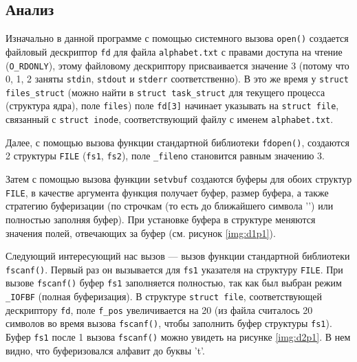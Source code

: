 
\clearpage

\subsection{Анализ}

Изначально в данной программе с помощью системного вызова \texttt{open()} создается файловый дескриптор \texttt{fd} для файла \texttt{alphabet.txt} с правами доступа на чтение (\texttt{O\_RDONLY}), этому файловому дескриптору присваивается значение 3 (потому что 0, 1, 2 заняты \texttt{stdin}, \texttt{stdout} и \texttt{stderr} соответственно). В это же время у \texttt{struct files\_struct} (можно найти в \texttt{struct task\_struct} для текущего процесса (структура ядра), поле \texttt{files}) поле \texttt{fd[3]} начинает указывать на \texttt{struct file}, связанный с \texttt{struct inode}, соответствующий файлу с именем \texttt{alphabet.txt}.

Далее, с помощью вызова функции стандартной библиотеки \texttt{fdopen()}, создаются 2 структуры \texttt{FILE} (\texttt{fs1}, \texttt{fs2}), поле \texttt{\_fileno} становится равным значению 3.

Затем с помощью вызова функции \texttt{setvbuf} создаются буферы для обоих структур \texttt{FILE}, в качестве аргумента функция получает буфер, размер буфера, а также стратегию буферизации (по строчкам (то есть до ближайшего символа '\n') или полностью заполняя буфер). При установке буфера в структуре меняются значения полей, отвечающих за буфер (см. рисунок \ref{img:d1p1}).


\clearpage

Следующий интересующий нас вызов --- вызов функции стандартной библиотеки \texttt{fscanf()}. Первый раз он вызывается для \texttt{fs1} указателя на структуру \texttt{FILE}. При вызове \texttt{fscanf()} буфер \texttt{fs1} заполняется полностью, так как был выбран режим \texttt{\_IOFBF} (полная буферизация). В структуре \texttt{struct file}, соответствующей дескриптору \texttt{fd}, поле \texttt{f\_pos} увеличивается на 20 (из файла считалось 20 символов во время вызова \texttt{fscanf()}, чтобы заполнить буфер структуры \texttt{fs1}). Буфер \texttt{fs1} после 1 вызова \texttt{fscanf()} можно увидеть на рисунке \ref{img:d2p1}. В нем видно, что буферизовался алфавит до буквы 't'.

